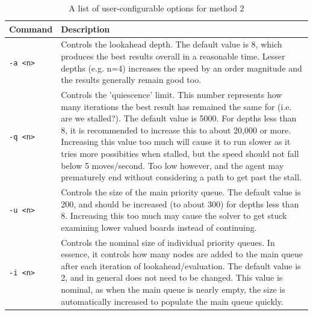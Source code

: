 \documentclass[a4paper, 11pt, titlepage]{report}
\begin{document}
\begin{table}[H]
  \centering
  \caption{A list of user-configurable options for method 2}
    \begin{tabularx}{\textwidth}{lX}
    \hline
    Command & Description \\
    \hline
    \texttt{-a <n>} & Controls the lookahead depth. The default value is 8, which produces the best results overall in a reasonable time. Lesser depths (e.g. n=4) increases the speed by an order magnitude and the results generally remain good too.  \\
    \texttt{-q <n>} & Controls the 'quiescence' limit. This number represents how many iterations the best result has remained the same for (i.e. are we stalled?). The default value is 5000. For depths less than 8, it is recommended to increase this to about 20,000 or more. Increasing this value too much will cause it to run slower as it tries more possibities when stalled, but the speed should not fall below 5 moves/second. Too low however, and the agent may prematurely end without considering a path to get past the stall.\\
    \texttt{-u <n>} & Controls the size of the main priority queue. The default value is 200, and should be increased (to about 300) for depths less than 8. Increasing this too much may cause the solver to get stuck examining lower valued boards instead of continuing. \\
    \texttt{-i <n>} & Controls the nominal size of individual priority queues. In essence, it controls how many nodes are added to the main queue after each iteration of lookahead/evaluation. The default value is 2, and in general does not need to be changed. This value is nominal, as when the main queue is nearly empty, the size is automatically increased to populate the main queue quickly. \\
    \hline
    \end{tabularx}%
  \label{tab:method2-parameters}%
\end{table}%
\end{document}
